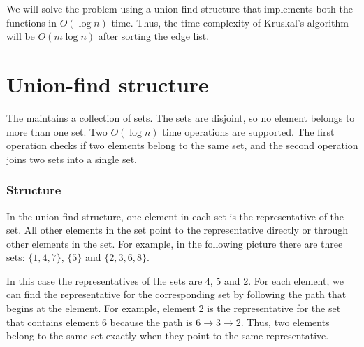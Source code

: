 We will solve the problem using a union-find structure
that implements both the functions in $O(\log n)$ time.
Thus, the time complexity of Kruskal's algorithm
will be $O(m \log n)$ after sorting the edge list.

\section{Union-find structure}


The  maintains
a collection of sets.
The sets are disjoint, so no element
belongs to more than one set.
Two $O(\log n)$ time operations are supported.
The first operation checks if two elements
belong to the same set,
and the second operation joins two sets into a single set.

\subsubsection{Structure}

In the union-find structure, one element in each set
is the representative of the set.
All other elements in the set point to the
representative directly or through other elements in the set.
For example, in the following picture there are three sets:
$\{1,4,7\}$, $\{5\}$ and $\{2,3,6,8\}$.
\begin{center}
\end{center}
In this case the representatives
of the sets are 4, 5 and 2.
For each element, we can find the representative
for the corresponding set by following the
path that begins at the element.
For example, element 2 is the representative for the set
that contains element 6 because
the path is $6 \rightarrow 3 \rightarrow 2$.
Thus, two elements belong to the same set exactly when
they point to the same representative.

